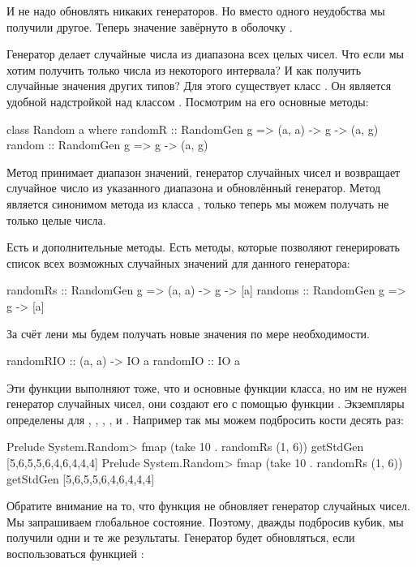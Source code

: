 И не надо обновлять никаких генераторов. Но вместо одного неудобства мы
получили другое. Теперь значение завёрнуто в оболочку .

Генератор  делает случайные числа из диапазона всех целых
чисел. Что если мы хотим получить только числа из некоторого интервала?
И как получить случайные значения других типов? Для этого существует
класс . Он является удобной надстройкой над классом
. Посмотрим на его основные методы:


\begin{code}
class Random a where
    randomR :: RandomGen g => (a, a) -> g -> (a, g)
    random  :: RandomGen g => g -> (a, g)
\end{code}

Метод  принимает диапазон значений, генератор случайных
чисел и возвращает случайное число из указанного диапазона и обновлённый
генератор. Метод  является синонимом метода  из
класса , только теперь мы можем получать не только целые
числа.

Есть и дополнительные методы. Есть методы, которые позволяют
генерировать список всех возможных случайных значений для данного
генератора:


\begin{code}
    randomRs :: RandomGen g => (a, a) -> g -> [a]
    randoms  :: RandomGen g => g -> [a]
\end{code}

За счёт лени мы будем получать новые значения по мере необходимости.


\begin{code}
    randomRIO   :: (a, a) -> IO a
    randomIO    :: IO a
\end{code}

Эти функции выполняют тоже, что и основные функции класса, но им не
нужен генератор случайных чисел, они создают его с помощью функции
. Экземпляры  определены для ,
, , ,  и . Например
так мы можем подбросить кости десять раз:


\begin{code}
Prelude System.Random> fmap (take 10 . randomRs (1, 6)) getStdGen
[5,6,5,5,6,4,6,4,4,4]
Prelude System.Random> fmap (take 10 . randomRs (1, 6)) getStdGen
[5,6,5,5,6,4,6,4,4,4]
\end{code}

Обратите внимание на то, что функция  не обновляет
генератор случайных чисел. Мы запрашиваем глобальное состояние. Поэтому,
дважды подбросив кубик, мы получили одни и те же результаты. Генератор
будет обновляться, если воспользоваться функцией :


